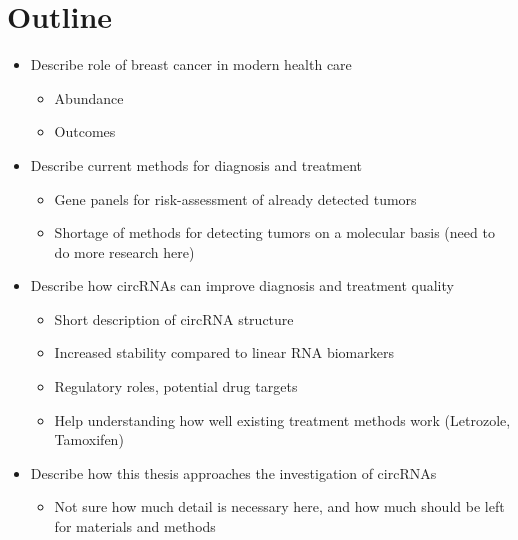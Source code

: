 \section{Outline}

\begin{itemize}
    \item Describe role of breast cancer in modern health care
    \begin{itemize}
        \item Abundance
        \item Outcomes
    \end{itemize}
    \item Describe current methods for diagnosis and treatment
    \begin{itemize}
        \item Gene panels for risk-assessment of already detected tumors
        \item Shortage of methods for detecting tumors on a molecular basis (need to do more research here)
    \end{itemize}
    \item Describe how circRNAs can improve diagnosis and treatment quality
    \begin{itemize}
        \item Short description of circRNA structure
        \item Increased stability compared to linear RNA biomarkers
        \item Regulatory roles, potential drug targets
        \item Help understanding how well existing treatment methods work (Letrozole, Tamoxifen)
    \end{itemize}
    \item Describe how this thesis approaches the investigation of circRNAs
    \begin{itemize}
        \item Not sure how much detail is necessary here, and how much should be left for materials and methods
    \end{itemize}
\end{itemize}
